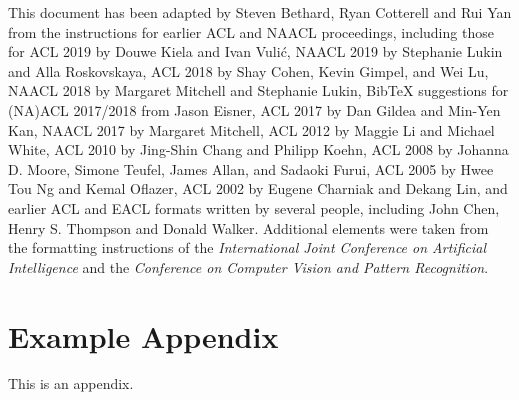 This document has been adapted
by Steven Bethard, Ryan Cotterell and Rui Yan
from the instructions for earlier ACL and NAACL proceedings, including those for
ACL 2019 by Douwe Kiela and Ivan Vuli\'{c},
NAACL 2019 by Stephanie Lukin and Alla Roskovskaya,
ACL 2018 by Shay Cohen, Kevin Gimpel, and Wei Lu,
NAACL 2018 by Margaret Mitchell and Stephanie Lukin,
Bib\TeX{} suggestions for (NA)ACL 2017/2018 from Jason Eisner,
ACL 2017 by Dan Gildea and Min-Yen Kan,
NAACL 2017 by Margaret Mitchell,
ACL 2012 by Maggie Li and Michael White,
ACL 2010 by Jing-Shin Chang and Philipp Koehn,
ACL 2008 by Johanna D. Moore, Simone Teufel, James Allan, and Sadaoki Furui,
ACL 2005 by Hwee Tou Ng and Kemal Oflazer,
ACL 2002 by Eugene Charniak and Dekang Lin,
and earlier ACL and EACL formats written by several people, including
John Chen, Henry S. Thompson and Donald Walker.
Additional elements were taken from the formatting instructions of the \emph{International Joint Conference on Artificial Intelligence} and the \emph{Conference on Computer Vision and Pattern Recognition}.

%



\appendix

\section{Example Appendix}
\label{sec:appendix}

This is an appendix.


